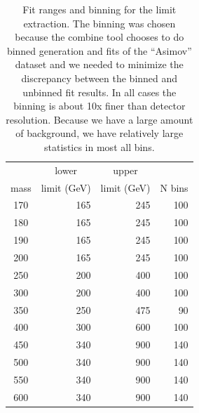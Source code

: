 \begin{table}[tbh]
  \caption{\label{tab:limitranges}Fit ranges and binning for the limit 
    extraction.  The binning was chosen because the combine tool 
    chooses to do binned generation and fits of the ``Asimov'' 
    dataset and we needed to minimize the discrepancy between the 
    binned and unbinned fit results.  In all cases the binning is about 
    10x finer than detector resolution.  Because we have a large amount 
    of background, we have relatively large statistics in most all bins.}
\begin{center}
\begin{tabular}{crrr}
\hline
     & \multicolumn{1}{c}{lower} & \multicolumn{1}{c}{upper} & \\
mass & \multicolumn{1}{c}{limit (GeV)} & \multicolumn{1}{c}{limit (GeV)} & N bins \\
\hline
170 & 165 & 245 & 100 \\
180 & 165 & 245 & 100 \\
190 & 165 & 245 & 100 \\
200 & 165 & 245 & 100 \\
250 & 200 & 400 & 100 \\
300 & 200 & 400 & 100 \\
350 & 250 & 475 & 90 \\
400 & 300 & 600 & 100 \\
450 & 340 & 900 & 140 \\
500 & 340 & 900 & 140 \\
550 & 340 & 900 & 140 \\
600 & 340 & 900 & 140 \\
\hline
\end{tabular}
\end{center}
\end{table}

